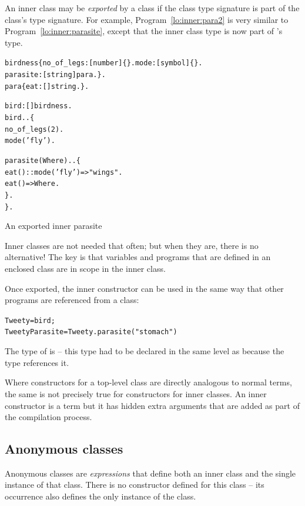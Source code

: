 An inner class may be \emph{exported} by a class if the class type signature is part of the class's type signature. For example, Program~\vref{lo:inner:para2} is very similar to Program~\ref{lo:inner:parasite}, except that the inner class type is now part of 's type.
\begin{program}
\vspace{0.5ex}
\begin{alltt}
birdness \impl \{ no_of_legs:[number]\{\}. mode:[symbol]\{\}.
    parasite:[string]\conarrow{}para. \}.
para\impl{}\{ eat:[]\funarrow{}string. \}.

bird:[]\conarrow{}birdness.
bird..\{
  no_of_legs(2).
  mode('fly').
  
  parasite(Where)..\{
    eat()::mode('fly')=>"wings".
    	eat()=>Where.
  \}.
\}.
\end{alltt}
\vspace{-2ex}
\caption{An exported inner parasite}
\label{lo:inner:para2}
\end{program}
\begin{aside}
Inner classes are not needed that often; but when they are, there is no alternative! The key is that variables and programs that are defined in an enclosed class are in scope in the inner class.
\end{aside}
Once exported, the inner constructor can be used in the same way that other programs are referenced from a class:
\begin{alltt}
Tweety = bird;
TweetyParasite = Tweety.parasite("stomach")
\end{alltt}
The type of  is  -- this type had to be declared in the same level as  because the  type references it.
\begin{aside}
Where constructors for a top-level class are directly analogous to normal \prolog terms, the same is not precisely true for constructors for inner classes. An inner constructor is a term but it has hidden extra arguments that are added as part of the compilation process.
\end{aside}


\subsection{Anonymous classes}
\label{lo:anonymous}
Anonymous classes are \emph{expressions} that define both an inner class and the single instance of that class. There is no constructor defined for this class -- its occurrence also defines the only instance of the class.

